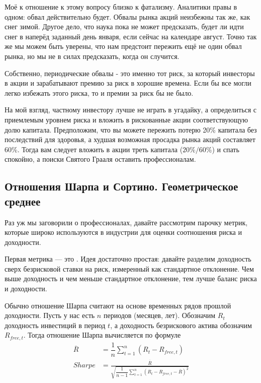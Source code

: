 Моё к отношение к этому вопросу близко к фатализму. Аналитики правы в одном: обвал действительно будет. Обвалы рынка акций неизбежны так же, как снег зимой. Другое дело, что наука пока не может предсказать, будет ли идти снег в наперёд заданный день января, если сейчас на календаре август. Точно так же мы можем быть уверены, что нам предстоит пережить ещё не один обвал рынка, но мы не в силах предсказать, когда он случится.

Собственно, периодические обвалы - это именно тот риск, за который инвесторы в акции и зарабатывают премию за риск в хорошие времена. Если бы все могли легко избежать этого риска, то и премии за риск бы не было.

На мой взгляд, частному инвестору лучше не играть в угадайку, а определиться с приемлемым уровнем риска и вложить в рискованные акции соответствующую долю капитала. Предположим, что вы можете пережить потерю 20\% капитала без последствий для здоровья, а худшая возможная просадка рынка акций составляет 60\%. Тогда вам следует вложить в акции треть капитала ($20\%/60\%$) и спать спокойно, а поиски Святого Грааля оставить профессионалам.

\subsection{Отношения Шарпа и Сортино. Геометрическое среднее}

Раз уж мы заговорили о профессионалах, давайте рассмотрим парочку метрик, которые широко используются в индустрии для оценки соотношения риска и 
доходности.

Первая метрика --- это . Идея достаточно простая: давайте разделим доходность сверх безрисковой ставки на риск, 
измеренный как стандартное отклонение. Чем выше доходность и чем меньше 
стандартное отклонение, тем лучше баланс риска и доходности.

Обычно отношение Шарпа считают на основе временных рядов прошлой доходности. Пусть у нас есть $n$ периодов (месяцев, лет). Обозначим $R_t$ доходность инвестиций в период $t$, а доходность безрискового актива обозначим  $R_{free,t}$. Тогда отношение Шарпа вычисляется по формуле
\begin{align}
\nonumber
\overline{R} &= \dfrac{1}{n}\sum\limits_{t=1}^{n}(R_t - R_{free,t}) \\
Sharpe &= \frac
    {\overline{R}}
    {\sqrt{
        \dfrac{1}{n-1} 
        \sum\limits_{t=1}^{n}(R_t - R_{free,t} - \overline{R})^2
    }}
\label{sharpe_ratio_formula}
\end{align}

